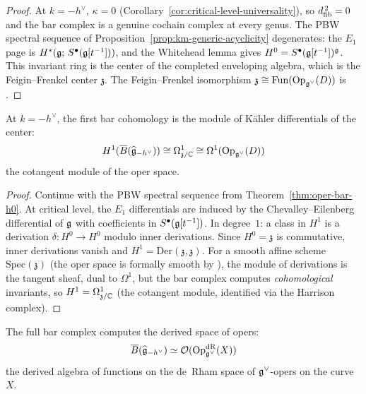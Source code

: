 \begin{proof}
At $k = -h^\vee$, $\kappa = 0$
(Corollary~\ref{cor:critical-level-universality}), so $d_{\mathrm{fib}}^{\,2} = 0$
and the bar complex is a genuine cochain complex at every genus.  The PBW spectral
sequence of Proposition~\ref{prop:km-generic-acyclicity} degenerates:
the $E_1$ page is $H^*(\mathfrak{g};\, S^\bullet(\mathfrak{g}[t^{-1}]))$, and the
Whitehead lemma gives $H^0 = S^\bullet(\mathfrak{g}[t^{-1}])^{\mathfrak{g}}$.
This invariant ring is the center of the completed enveloping algebra,
which is the Feigin--Frenkel center $\mathfrak{z}$.  The
Feigin--Frenkel isomorphism
$\mathfrak{z} \cong \mathrm{Fun}(\mathrm{Op}_{\mathfrak{g}^\vee}(D))$ is
\ClaimStatusProvedElsewhere{} \cite{Feigin-Frenkel, FG06}.
\end{proof}

\begin{proposition}\label{prop:oper-bar-h1}
At $k = -h^\vee$, the first bar cohomology is the module of
K\"ahler differentials of the center:
\begin{equation}\label{eq:bar-oper-h1}
H^1(\overline{B}(\widehat{\mathfrak{g}}_{-h^\vee}))
\cong \Omega^1_{\mathfrak{z}/\mathbb{C}}
\cong \Omega^1(\mathrm{Op}_{\mathfrak{g}^\vee}(D))
\end{equation}
the cotangent module of the oper space.
\end{proposition}

\begin{proof}
Continue with the PBW spectral sequence from
Theorem~\ref{thm:oper-bar-h0}.  At critical level, the $E_1$
differentials are induced by the Chevalley--Eilenberg differential
of $\mathfrak{g}$ with coefficients in $S^\bullet(\mathfrak{g}[t^{-1}])$.
In degree~$1$: a class in $H^1$ is a derivation
$\delta\colon H^0 \to H^0$ modulo inner derivations.  Since
$H^0 = \mathfrak{z}$ is commutative, inner derivations vanish and
$H^1 = \mathrm{Der}(\mathfrak{z}, \mathfrak{z})$.  For a smooth
affine scheme $\mathrm{Spec}(\mathfrak{z})$ (the oper space is
formally smooth by \cite{FG06}), the
module of derivations is the tangent sheaf, dual to $\Omega^1$,
but the bar complex computes \emph{cohomological} invariants, so
$H^1 = \Omega^1_{\mathfrak{z}/\mathbb{C}}$ (the cotangent module,
identified via the Harrison complex).
\end{proof}

\begin{theorem}\label{thm:oper-bar}
The full bar complex computes the derived space of opers:
\begin{equation}\label{eq:bar-derived-oper}
\overline{B}(\widehat{\mathfrak{g}}_{-h^\vee})
\simeq \mathcal{O}(\mathrm{Op}_{\mathfrak{g}^\vee}^{\mathrm{dR}}(X))
\end{equation}
the derived algebra of functions on the de~Rham space of
$\mathfrak{g}^\vee$-opers on the curve~$X$.
\end{theorem}

